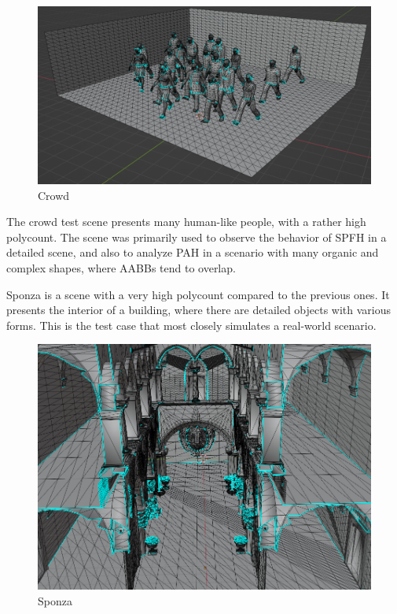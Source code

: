 \documentclass{PoliMi_MasterThesis}
\begin{document}
\begin{minipage}{0.4\textwidth}
	\begin{figure}[H]
		\includegraphics[width=\textwidth]{Images/crowd_scene.png}
		\caption{Crowd}
		\label{fig:crowd}
	\end{figure}
\end{minipage} \hfill
\begin{minipage}{0.55\textwidth}
	The crowd test scene presents many human-like people, with a rather high polycount. The scene was primarily used to observe the behavior of SPFH in a detailed scene, and also to analyze PAH in a scenario with many organic and complex shapes, where AABBs tend to overlap.
\end{minipage}

\begin{minipage}{0.55\textwidth}
	Sponza is a scene with a very high polycount compared to the previous ones. It presents the interior of a building, where there are detailed objects with various forms. This is the test case that most closely simulates a real-world scenario.
\end{minipage}
\hfill \begin{minipage}{0.4\textwidth}
	\begin{figure}[H]
		\includegraphics[width=\textwidth]{Images/sponza_scene.png}
		\caption{Sponza}
		\label{fig:sponza}
	\end{figure}
\end{minipage}
\end{document}
